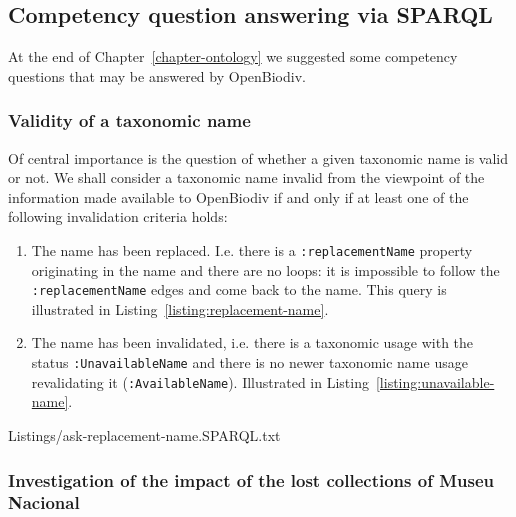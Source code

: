 \subsection{Competency question answering via SPARQL}

At the end of Chapter~\ref{chapter-ontology} we suggested some competency questions that may be answered by OpenBiodiv.

\subsubsection{Validity of a taxonomic name}

Of central importance is the question of whether a given taxonomic name is valid or not. We shall consider a taxonomic name invalid from the viewpoint of the information made available to OpenBiodiv if and only if at least one of the following invalidation criteria holds:

\begin{enumerate}
\item{The name has been replaced. I.e. there is a {\tt :replacementName} property originating in the name and there are no loops: it is impossible to follow the {\tt :replacementName} edges and come back to the name. This query is illustrated in Listing~\ref{listing:replacement-name}}.
\item{The name has been invalidated, i.e. there is a taxonomic usage with the status {\tt :UnavailableName} and there is no newer taxonomic name usage revalidating it ({\tt :AvailableName}). Illustrated in Listing~\ref{listing:unavailable-name}.}
\end{enumerate}


{Listings/ask-replacement-name.SPARQL.txt}



\subsubsection{Investigation of the impact of the lost collections of Museu Nacional}

